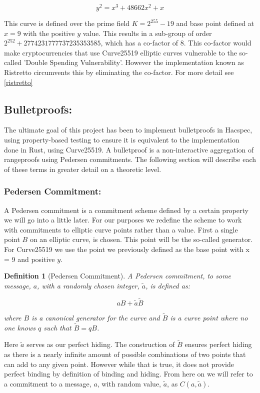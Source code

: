 \documentclass{article}
\newtheorem{definition}{Definition}[section]
\newcommand{\tB}{\widetilde{B}}
\begin{document}
$$y^2 = x^3 + 48662x^2 + x$$

This curve is defined over the prime field $K = 2^{255} - 19$ and base
point defined at $x = 9$ with the positive $y$ value. This results in a
sub-group of order $2^{252} + 2774231777737235353585$, which has a
co-factor of $8$. This co-factor would make cryptocurrencies that use
Curve25519 elliptic curves vulnerable to the so-called 'Double Spending
Vulnerability'. However the implementation known as Ristretto circumvents
this by eliminating the co-factor. For more detail see \ref{ristretto}

\subsection{Bulletproofs:}\label{Bulletproofs}

The ultimate goal of this project has been to implement bulletproofs in
Hacspec, using property-based testing to ensure it is equivalent to the
implementation done in Rust, using Curve25519. A bulletproof is a
non-interactive aggregation of rangeproofs using Pedersen commitments.
The following section will describe each of these terms in greater detail
on a theoretic level.

\subsubsection{Pedersen Commitment:}

A Pedersen commitment is a commitment scheme defined by a certain
property we will go into a little later. For our purposes we redefine
the scheme to work with commitments to elliptic curve points rather than
a value. First a single point $B$ on an elliptic curve, is chosen. This point will be the so-called generator. For
Curve25519 we use the point we previously defined as the base point with x =
9 and positive $y$.

\begin{definition}[Pedersen Commitment]
	A Pedersen commitment, to some message, $a$, with a randomly chosen
	integer, $\widetilde{a}$, is defined as:

	$$aB + \widetilde{a}\tB$$

	where $B$ is a canonical generator for the curve and $\tB$
	is a curve point where no one knows $q$ such that $\tB = qB$.
\end{definition}

Here $\widetilde{a}$ serves as our perfect hiding. The construction of $\tB$ ensures perfect hiding as there is a nearly infinite
amount of possible combinations of two points that can add to any given
point. However while that is true, it does not provide perfect binding by
definition of binding and hiding. From here on we will refer to a
commitment to a message, $a$, with random value, $\widetilde{a}$, as $C(a,\widetilde{a})$.
\end{document}
